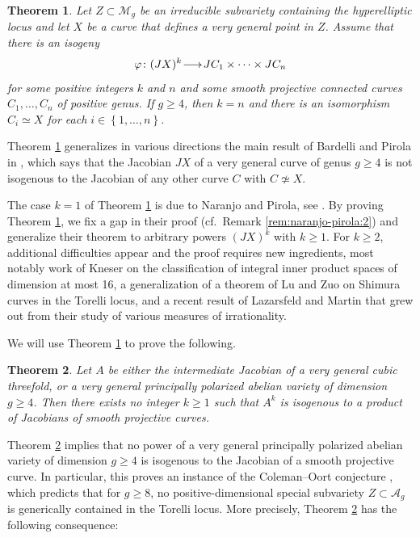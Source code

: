 \documentclass[a4paper,11pt,reqno]{amsart}
\makeatletter
\numberwithin{equation}{section}
\newtheorem{theorem}{Theorem}[section]
\theoremstyle{plain}
\theoremstyle{definition}
\newcommand{\ca}[1]{{\mathcal{#1}}}
\renewcommand{\longrightarrow}{\xymatrix@1@=15pt{\ar[r]&}}
\renewcommand{\cong}{\simeq}
\newcommand{\set}[1]{\left\{ #1 \right\}}
\makeatother
\begin{document}
\begin{theorem}
\label{theorem:maintheorem1:hyperelliptic} 
Let $Z \subset \ca M_g$ be an irreducible subvariety containing the hyperelliptic locus and let $X$ be a curve that defines a very general point in $Z$. 
Assume that there is an isogeny
$$
\varphi\colon (JX)^k\longrightarrow JC_1 \times \cdots \times JC_n
$$
for some positive integers $k$ and $n$ and some smooth projective connected curves $C_1,\dots ,C_n$ of positive genus. If $g \geq 4$, then $k = n$ and there is an isomorphism $C_i \cong X$ for each $i \in \set{1, \dotsc, n}$. 
\end{theorem}

Theorem \ref{theorem:maintheorem1:hyperelliptic} generalizes in various directions the main result of Bardelli and Pirola in \cite{bardellipirola-curvesofgenusg}, which says that  
the Jacobian $JX$ of a very general curve of genus $g\geq 4$ is not isogenous to the Jacobian of any other curve $C$ with $C\not \cong X$. 

The case $k=1$ of Theorem \ref{theorem:maintheorem1:hyperelliptic} is due to Naranjo and Pirola, see \cite[Theorem 1.1]{naranjopirola2018}. 
By proving Theorem \ref{theorem:maintheorem1:hyperelliptic},  
we fix a gap in their proof (cf.\ Remark \ref{rem:naranjo-pirola:2}) and generalize their theorem to arbitrary powers $(JX)^k$ with $k\geq 1$.  
For $k\geq 2$,  
additional difficulties appear and the proof requires new ingredients, most notably work of Kneser \cite{kneser-quadratisch} on the classification of integral inner product spaces of dimension at most 16,  a generalization of a theorem of Lu and Zuo \cite{luzuo-shimuracurves} on Shimura curves in the Torelli locus, and a recent result of Lazarsfeld and Martin \cite{lazarsfeld2023measures} that grew out from their study of various measures of irrationality. 

We will use 
Theorem \ref{theorem:maintheorem1:hyperelliptic} to prove the following.
 
\begin{theorem} \label{thm:cor:maintheorem2}
Let $A$ be either the intermediate Jacobian of a very general cubic threefold, or a very general principally polarized abelian variety of dimension $g \geq 4$. Then there exists no integer $k \geq 1$ such that $A^k$ is isogenous to a product of Jacobians of smooth projective curves. 
\end{theorem}


Theorem \ref{thm:cor:maintheorem2} implies 
that no power of a very general principally polarized abelian variety of dimension $g \geq 4$ is isogenous to the Jacobian of a smooth projective curve. 
In particular, this proves an instance of the Coleman--Oort conjecture \cite[Expectation 4.2]{moonenoort-specialsubvarieties}, which predicts that for $g\geq 8$, no positive-dimensional special subvariety $Z \subset \ca A_g$ is generically contained in the Torelli locus.
More precisely, Theorem \ref{thm:cor:maintheorem2} has the following consequence:
\end{document}

